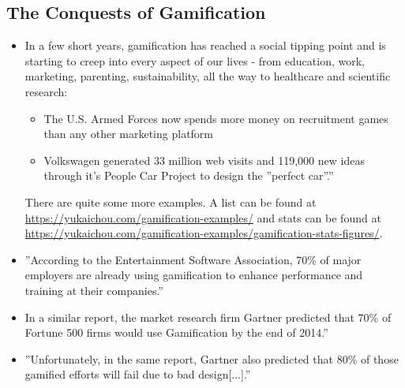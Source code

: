 \subsection{The Conquests of Gamification}
\begin{itemize}
    \item In a few short years, gamification has reached a social tipping point and is starting to creep into every aspect of our lives - from education, work, marketing, parenting, sustainability, all the way to healthcare and scientific research:
    \begin{itemize}
        \item The U.S. Armed Forces now spends more money on recruitment games than any other marketing platform
        \item Volkswagen generated 33 million web visits and 119,000 new ideas through it's People Car Project to design the ''perfect car''.''
    \end{itemize}
    There are quite some more examples. A list can be found at \url{https://yukaichou.com/gamification-examples/} and stats can be found at \url{https://yukaichou.com/gamification-examples/gamification-stats-figures/}.
    \item ''According to the Entertainment Software Association, 70\% of major employers are already using gamification to enhance performance and training at their companies.''
    \item In a similar report, the market research firm Gartner predicted that 70\% of Fortune 500 firms would use Gamification by the end of 2014.''
    \item ''Unfortunately, in the same report, Gartner also predicted that 80\% of those gamified efforts will fail due to bad design[...].''
\end{itemize}